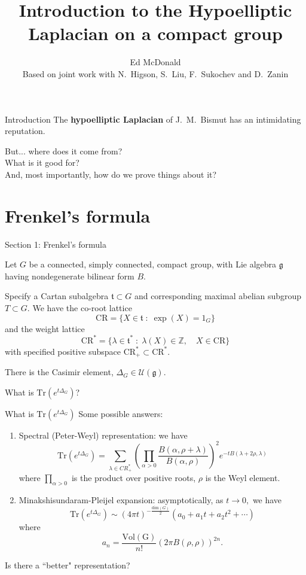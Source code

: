 \documentclass{beamer}
\newcommand\makebeamertitle{\frame{\maketitle}}%
\numberwithin{equation}{section}
\theoremstyle{plain}
\theoremstyle{plain}
\theoremstyle{definition}
\theoremstyle{plain}
\theoremstyle{plain}
\theoremstyle{definition}
\newcommand{\Itgr}{\mathbb{Z}}
\newcommand{\Uc}{\mathcal{U}}
\newcommand{\Tr}{\mathrm{Tr}}
\newcommand{\gf}{\mathfrak{g}}
\newcommand{\tf}{\mathfrak{t}}
\newcommand{\CR}{\mathrm{CR}}
\begin{document}
\title[Introduction to the Hypoelliptic Laplacian]{Introduction to the Hypoelliptic Laplacian on a compact group}


\author[E. McDonald]{Ed McDonald\\
Based on joint work with N.~Higson, S.~Liu, F.~Sukochev and D.~Zanin}



\makebeamertitle

\begin{frame}{Introduction}
  The \textbf{hypoelliptic Laplacian} of J.~M.~Bismut has an intimidating reputation.
  
  \pause
  But... where does it come from?\\
  \pause
  What is it good for?\\
  \pause
  And, most importantly, how do we prove things about it?
\end{frame}

\section{Frenkel's formula}

\begin{frame}
  \huge{Section 1: Frenkel's formula}
\end{frame}

\begin{frame}
  Let $G$ be a connected, simply connected, compact group, with Lie algebra $\gf$ having nondegenerate bilinear form $B.$
  
  Specify a Cartan subalgebra $\tf \subset G$ and corresponding maximal abelian subgroup $T\subset G.$
  We have the co-root lattice
  \[
    \CR = \{X \in \tf\;:\; \exp(X) = 1_G\}
  \]
  and the weight lattice 
  \[
  \CR^* = \{\lambda \in \tf^*\;:\; \lambda(X) \in \Itgr,\quad X \in \CR\}
  \]
  with specified positive subspace $\CR_+^*\subset \CR^*.$
  
  There is the Casimir element, $\Delta_G \in \Uc(\gf).$
   
  What is $\Tr(e^{t\Delta_G})$? 
\end{frame}

\begin{frame}{What is $\Tr(e^{t\Delta_G})$}
  Some possible answers:
  \begin{enumerate}
    \item{} Spectral (Peter-Weyl) representation: we have
    \[
        \Tr(e^{t\Delta_G}) = \sum_{\lambda\in CR^*_+} \left(\prod_{\alpha>0} \frac{B(\alpha,\rho+\lambda)}{B(\alpha,\rho)}\right)^2e^{-tB(\lambda+2\rho,\lambda)}
    \]
    where $\prod_{\alpha>0}$ is the product over positive roots, $\rho$ is the Weyl element.
    \item{} Minakshisundaram-Pleijel expansion: asymptotically, as $t\to 0,$ we have
    \[
        \Tr(e^{t\Delta_G}) \sim (4\pi t)^{-\frac{\mathrm{dim}(G)}{2}}(a_0+a_1t+a_2t^2+\cdots)
    \]
    where 
    \[
      a_n = \frac{\mathrm{Vol(G)}}{n!}(2\pi B(\rho,\rho))^{2n}.
    \]
  \end{enumerate}
  \pause
  Is there a ``better" representation?
\end{frame}
\end{document}
